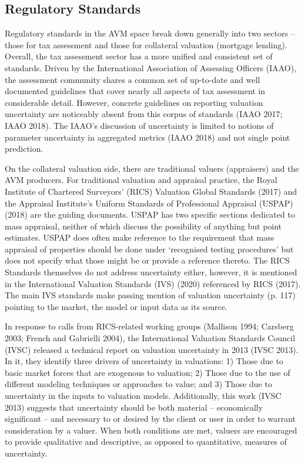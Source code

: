 \documentclass[colTwo]{anon}
\theoremstyle{definition}
\begin{document}
\subsection{Regulatory Standards}

Regulatory standards in the AVM space break down generally into two sectors -- those for tax assessment and those for collateral valuation (mortgage lending).  Overall, the tax assessment sector has a more unified and consistent set of standards.  Driven by the International Association of Assessing Officers (IAAO), the assessment community shares a common set of up-to-date and well documented guidelines that cover nearly all aspects of tax assessment in considerable detail.  However, concrete guidelines on reporting valuation uncertainty are noticeably absent from this corpus of standards (IAAO 2017; IAAO 2018). The IAAO's discussion of uncertainty is limited to notions of parameter uncertainty in aggregated metrics (IAAO 2018) and not single point prediction.  

On the collateral valuation side, there are traditional valuers (appraisers) and the AVM producers. For traditional valuation and appraisal practice, the Royal Institute of Chartered Surveyors’ (RICS) Valuation Global Standards (2017) and the Appraisal Institute’s Uniform Standards of Professional Appraisal (USPAP) (2018) are the guiding documents. USPAP has two specific sections dedicated to mass appraisal, neither of which discuss the possibility of anything but point estimates. USPAP does often make reference to the requirement that mass appraisal of properties should be done under ‘recognised testing procedures’ but does not specify what those might be or provide a reference thereto. The RICS Standards themselves do not address uncertainty either, however, it is mentioned in the International Valuation Standards (IVS) (2020) referenced by RICS (2017).  The main IVS standards make passing mention of valuation uncertainty (p. 117) pointing to the market, the model or input data as its source.  

In response to calls from RICS-related working groups (Mallison 1994; Carsberg 2003; French and Gabrielli 2004), the International Valuation Standards Council (IVSC) released a technical report on valuation uncertainty in 2013 (IVSC 2013).  In it, they identify three drivers of uncertainty in valuations: 1) Those due to basic market forces that are exogenous to valuation; 2) Those due to the use of different modeling techniques or approaches to value; and 3) Those due to uncertainty in the inputs to valuation models. Additionally, this work (IVSC 2013) suggests that uncertainty should be both material -- economically significant -- and necessary to or desired by the client or user in order to warrant consideration by a valuer. When both conditions are met, valuers are encouraged to provide qualitative and descriptive, as opposed to quantitative, measures of uncertainty.     
\end{document}
